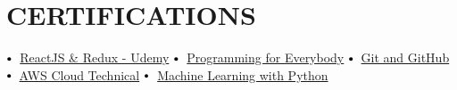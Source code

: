 \documentclass[letterpaper,11pt]{article}
\newcommand\sbullet[1][.5]{\mathbin{\vcenter{\hbox{\scalebox{#1}{$\bullet$}}}}}
\begin{document}
\section{CERTIFICATIONS}


$\sbullet[.75] \hspace{0.1cm}$ {\href{certificateLink.com}{ReactJS \& Redux - Udemy}} \hspace{1.6cm}
$\sbullet[.75] \hspace{0.1cm}$ {\href{https://coursera.org/share/f2d22aac5fc916148e0dd4397fb25805}{Programming for Everybody}} \hspace{2.59cm}
$\sbullet[.75] \hspace{0.2cm}${\href{https://coursera.org/share/89dc67e456ae63a6bb82d13944329d44}{Git and GitHub}} \\

$\sbullet[.75] \hspace{0.2cm}${\href{certificateLink.com}{AWS Cloud Technical}} \hspace{2.6cm}
$\sbullet[.75] \hspace{0.1cm}$ {\href{https://coursera.org/share/f0c8124625495a812465bc7393917815}{Machine Learning with Python}} \hspace{2.6cm}



\end{document}
